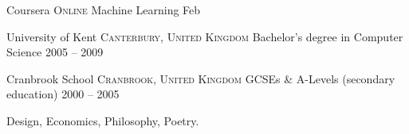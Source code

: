 \documentclass[10pt,a4paper]{article}
\begin{document}

\headedsection
  {Coursera}
  {\textsc{Online}} {%
  \headedsubsection
    {Machine Learning}
    {Feb }
    {
  }
}

\headedsection
  {University of Kent}
  {\textsc{Canterbury, United Kingdom}} {%
  \headedsubsection
    {Bachelor's degree in Computer Science}
    {2005 -- 2009}
    {\bodytext{}
  }
}

\headedsection
  {Cranbrook School}
  {\textsc{Cranbrook, United Kingdom}} {%
  \headedsubsection
    {GCSEs \& A-Levels \textnormal{(secondary education)}}
    {2000 -- 2005}
    {\bodytext{}
  }
}

\spacedhrule{0em}{-0.4em}


\inlineheadsection
  {}
  {Design, Economics, Philosophy, Poetry.}
\end{document}
